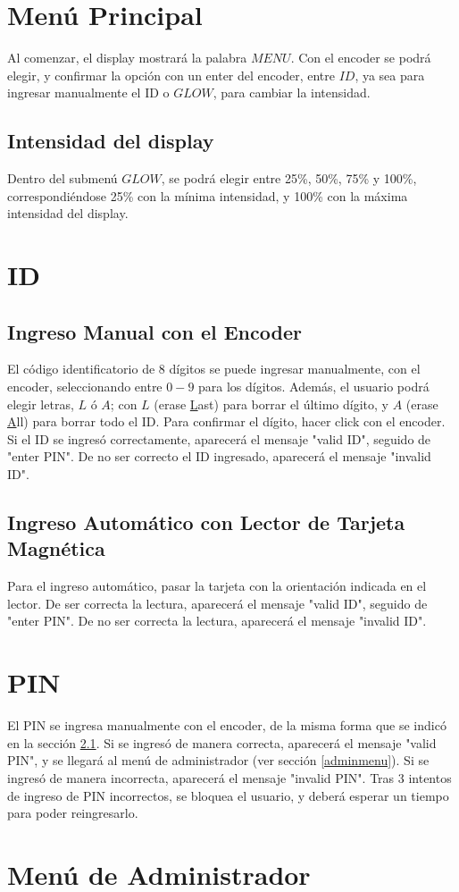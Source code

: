 \section{Menú Principal}

Al comenzar, el display mostrará la palabra $MENU$. 
Con el encoder se podrá elegir, y confirmar la opción con un enter del encoder, entre $ID$, 
ya sea para ingresar manualmente el ID o $GLOW$, para cambiar la intensidad.

\subsection{Intensidad del display}

Dentro del submenú $GLOW$, se podrá elegir entre 25\%, 50\%, 75\% y 100\%, 
correspondiéndose 25\% con la mínima intensidad, y 100\% con la máxima intensidad del display.

\section{ID}
\subsection{Ingreso Manual con el Encoder}
\label{pinsection}
El código identificatorio de 8 dígitos se puede ingresar manualmente, con el encoder, 
seleccionando entre $0-9$ para los dígitos. Además, el usuario podrá elegir letras, $L$ ó $A$;
con $L$ (erase \underline{L}ast) para borrar el último dígito, y $A$ (erase \underline{A}ll)
 para borrar todo el ID.
 Para confirmar el dígito, hacer click con el encoder.
 Si el ID se ingresó correctamente, aparecerá el mensaje "valid ID", seguido de "enter PIN".
 De no ser correcto el ID ingresado, aparecerá el mensaje "invalid ID".

 \subsection{Ingreso Automático con Lector de Tarjeta Magnética}
 Para el ingreso automático, pasar la tarjeta con la orientación indicada en el lector.
 De ser correcta la lectura, aparecerá el mensaje "valid ID", seguido de "enter PIN".
 De no ser correcta la lectura, aparecerá el mensaje "invalid ID".

 \section{PIN}
 El PIN se ingresa manualmente con el encoder, de la misma forma 
 que se indicó en la sección \ref{pinsection}.
 Si se ingresó de manera correcta, aparecerá el mensaje "valid PIN", 
 y se llegará al menú de administrador (ver sección \ref{adminmenu}).
Si se ingresó de manera incorrecta, aparecerá el mensaje "invalid PIN".
Tras 3 intentos de ingreso de PIN incorrectos, se bloquea el usuario, 
y deberá esperar un tiempo para poder reingresarlo.


 \section{Menú de Administrador}


